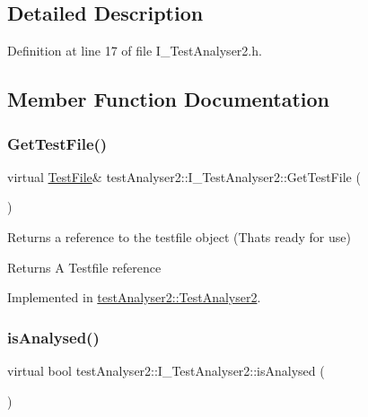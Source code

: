 \subsection{Detailed Description}


Definition at line 17 of file I\+\_\+\+Test\+Analyser2.\+h.



\subsection{Member Function Documentation}
\mbox{\label{classtestAnalyser2_1_1I__TestAnalyser2_a82d50511e174a98572f8706d8ef06cc6}} 
\subsubsection{\texorpdfstring{GetTestFile()}{GetTestFile()}}
{\footnotesize\ttfamily virtual \mbox{\hyperlink{classtestAnalyser2_1_1TestFile}{Test\+File}}\& test\+Analyser2\+::\+I\+\_\+\+Test\+Analyser2\+::\+Get\+Test\+File (\begin{DoxyParamCaption}{ }\end{DoxyParamCaption})\hspace{0.3cm}{\ttfamily [pure virtual]}}



Returns a reference to the testfile object (That\textquotesingle{}s ready for use) 

\begin{DoxyReturn}{Returns}
A Testfile reference 
\end{DoxyReturn}


Implemented in \mbox{\hyperlink{classtestAnalyser2_1_1TestAnalyser2_ab90ac14da653b04877d4f07698faf372}{test\+Analyser2\+::\+Test\+Analyser2}}.

\mbox{\label{classtestAnalyser2_1_1I__TestAnalyser2_ab0d67cf406b889585af9eaa4479540ee}} 
\subsubsection{\texorpdfstring{isAnalysed()}{isAnalysed()}}
{\footnotesize\ttfamily virtual bool test\+Analyser2\+::\+I\+\_\+\+Test\+Analyser2\+::is\+Analysed (\begin{DoxyParamCaption}{ }\end{DoxyParamCaption})\hspace{0.3cm}{\ttfamily [pure virtual]}}



